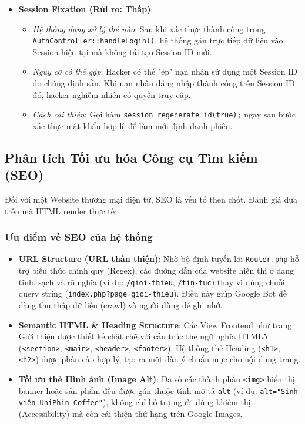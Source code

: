 \documentclass[pt = 12,a4paper]{article}
\begin{document}
\begin{itemize}
    \item \textbf{Session Fixation (Rủi ro: Thấp)}:
    \begin{itemize}
        \item \textit{Hệ thống đang xử lý thế nào}: Sau khi xác thực thành công trong \texttt{AuthController::handleLogin()}, hệ thống gán trực tiếp dữ liệu vào Session hiện tại mà không tái tạo Session ID mới.
        \item \textit{Nguy cơ có thể gặp}: Hacker có thể "ép" nạn nhân sử dụng một Session ID do chúng định sẵn. Khi nạn nhân đăng nhập thành công trên Session ID đó, hacker nghiễm nhiên có quyền truy cập.
        \item \textit{Cách cải thiện}: Gọi hàm \texttt{session\_regenerate\_id(true);} ngay sau bước xác thực mật khẩu hợp lệ để làm mới định danh phiên.
    \end{itemize}
\end{itemize}

\subsection{Phân tích Tối ưu hóa Công cụ Tìm kiếm (SEO)}
Đối với một Website thương mại điện tử, SEO là yếu tố then chốt. Đánh giá dựa trên mã HTML render thực tế:

\subsubsection{Ưu điểm về SEO của hệ thống}
\begin{itemize}
    \item \textbf{URL Structure (URL thân thiện)}: Nhờ bộ định tuyến lõi \texttt{Router.php} hỗ trợ biểu thức chính quy (Regex), các đường dẫn của website hiển thị ở dạng tĩnh, sạch và rõ nghĩa (ví dụ: \texttt{/gioi-thieu}, \texttt{/tin-tuc}) thay vì dùng chuỗi query string (\texttt{index.php?page=gioi-thieu}). Điều này giúp Google Bot dễ dàng thu thập dữ liệu (crawl) và người dùng dễ ghi nhớ.
    \item \textbf{Semantic HTML \& Heading Structure}: Các View Frontend như trang Giới thiệu được thiết kế chặt chẽ với cấu trúc thẻ ngữ nghĩa HTML5 (\texttt{<section>}, \texttt{<main>}, \texttt{<header>}, \texttt{<footer>}). Hệ thống thẻ Heading (\texttt{<h1>}, \texttt{<h2>}) được phân cấp hợp lý, tạo ra một dàn ý chuẩn mực cho nội dung trang.
    \item \textbf{Tối ưu thẻ Hình ảnh (Image Alt)}: Đa số các thành phần \texttt{<img>} hiển thị banner hoặc sản phẩm đều được gán thuộc tính mô tả \texttt{alt} (ví dụ: \texttt{alt="Sinh viên UniPhin Coffee"}), không chỉ hỗ trợ người dùng khiếm thị (Accessibility) mà còn cải thiện thứ hạng trên Google Images.
\end{itemize}
\end{document}

